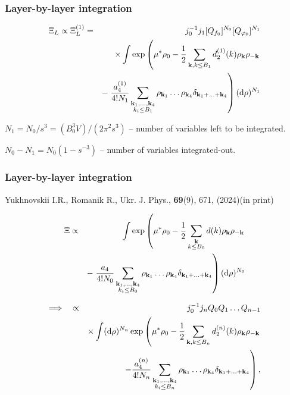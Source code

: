 \documentclass[8pt]{beamer}
\begin{document}
	\begin{frame}
		\frametitle{Layer-by-layer integration}
		
		\begin{eqnarray*}
			\Xi_L \propto \Xi_L^{(1)} & = & j_0^{-1}j_1 [Q_{f_0}]^{N_0} [Q_{\varphi_0}]^{N_1} 
			\\
			&& \times 
			\int \exp
			\left(
			\mu^*\rho_0 - \frac{1}{2} \sum_{\vb k, k \leq B_1} d_2^{(1)}(k) \rho_{\vb k} \rho_{-\vb k}
			\right.
			\nonumber \\
			&& -  
			\left.
			\frac{a_4^{(1)}}{4!N_1} \sum_{\substack{\vb k_1, \dotsc, \vb k_4 \\ k_i \leq B_1}}
			\rho_{\vb k_1} \dotsc \rho_{\vb k_4} \delta_{\vb{k}_1 + \dotsc + \vb{k}_4}
			\right) ({\rm d} \rho)^{N_1}
			\nonumber
		\end{eqnarray*}
		\hfill
		
		$N_1 = N_0 / s^3 = (B_0^3 V)/(2\pi^2 s^3)$ -- number of variables left to be integrated.
		\hfill
		\\
		\hfill
		
		$N_0 - N_1 = N_0(1-s^{-3})$ -- number of variables integrated-out.
	\end{frame}
	
	\begin{frame}
		\frametitle{Layer-by-layer integration}
		
		Yukhnovskii I.R., Romanik R., Ukr. J. Phys., {\bf 69}(9), 671, (2024)(in print)
		
		\begin{eqnarray*}
			\label{Xi_L_1}
			\Xi &\propto & 
			\int \exp\left(
			\mu^* \rho_0 - \frac{1}{2} \sum_{\substack{\vb k \\ k \leq B_0}} d(k) \rho_{\vb k} \rho_{-\vb k} 
			\right.\\
			&& -\left. \frac{a_4}{4! N_0} \sum_{\substack{\vb k_1, \dotsc, \vb k_4 \\ k_i \leq B_0}} \rho_{\vb k_1} \dotsc \rho_{\vb k_4} \delta_{\vb{k}_1 + \dotsc + \vb{k}_4} \right) ({\rm d} \rho)^{N_0}
			\nonumber
		\end{eqnarray*}
		
		\begin{eqnarray*}
			\Longrightarrow \quad
			&\propto & j_0^{-1}j_n Q_0 Q_1 \dotsc Q_{n-1} 
			\\
			&& \times 
			\int ({\rm d} \rho)^{N_n} \exp
			\left(
			\mu^*\rho_0 - \frac{1}{2} \sum_{\vb k, k \leq B_n} d_2^{(n)}(k) \rho_{\vb k} \rho_{-\vb k}
			\right.
			\nonumber \\
			&& 
			\left.
			- \frac{a_4^{(n)}}{4!N_n} \sum_{\substack{\vb k_1, \dotsc, \vb k_4 \\ k_i \leq B_n}}
			\rho_{\vb k_1} \dotsc \rho_{\vb k_4} \delta_{\vb{k}_1 + \dotsc + \vb{k}_4}
			\right)
			\nonumber ,
		\end{eqnarray*}
	\end{frame}
	
\end{document}
